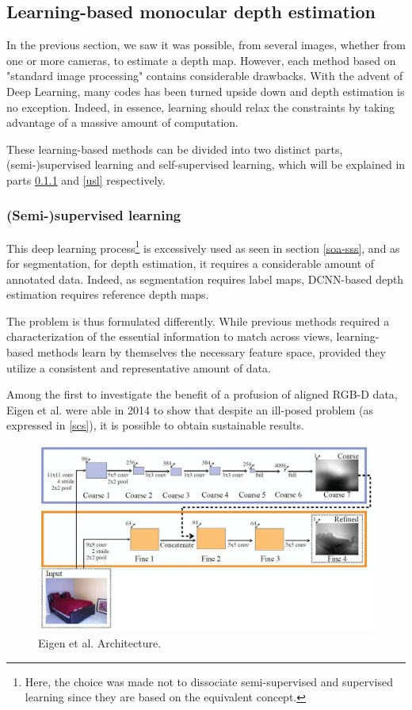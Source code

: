 \subsection{Learning-based monocular depth estimation}\label{mono-im}

In the previous section, we saw it was possible, from several images, whether from one or more cameras, to estimate a depth map. However, each method based on "standard image processing" contains considerable drawbacks. 
With the advent of Deep Learning, many codes has been turned upside down and depth estimation is no exception. Indeed, in essence, learning should relax the constraints by taking advantage of a massive amount of computation. 

These learning-based methods can be divided into two distinct parts, (semi-)supervised learning and self-supervised learning, which will be explained in parts \ref{ssl} and \ref{usl} respectively.

\subsubsection{(Semi-)supervised learning}\label{ssl}

This deep learning process\footnote{Here, the choice was made not to dissociate semi-supervised and supervised learning since they are based on the equivalent concept.} is excessively used as seen in section \ref{soa-sss}, and as for segmentation, for depth estimation, it requires a considerable amount of annotated data. Indeed, as segmentation requires label maps, DCNN-based depth estimation requires reference depth maps.

The problem is thus formulated differently. While previous methods required a characterization of the essential information to match across views, learning-based methods learn by themselves the necessary feature space, provided they utilize a consistent and representative amount of data.

Among the first to investigate the benefit of a profusion of aligned RGB-D data, Eigen et al.\cite{eigen2014depth} were able in 2014 to show that despite an ill-posed problem (as expressed in \ref{scs}), it is possible to obtain sustainable results.

\begin{figure}[h]
	\centering
	\includegraphics[width=0.8\linewidth]{Figures/SOA/arch-eigen}
	\caption[Eigen et al. Architecture.]{Eigen et al.\cite{eigen2014depth} Architecture.}
	\label{arch-eigen}
\end{figure}


